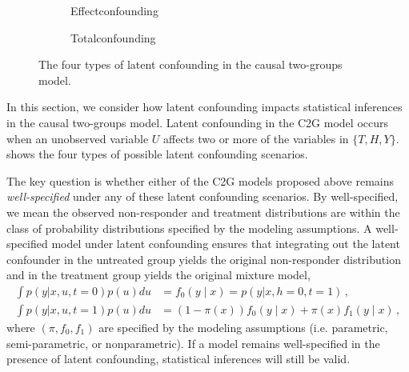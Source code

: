 \begin{figure*}[t]
\begin{subfigure}{0.22\linewidth}
{}
\caption{\centering \label{fig:confounding:effect}Effect\newline confounding}
\end{subfigure}\quad
\begin{subfigure}{0.22\linewidth}
\centering
{}
\caption{\centering \label{fig:confounding:total}Total\newline confounding}
\end{subfigure}
\caption{\label{fig:confounding}
The four types of latent confounding in the causal two-groups model.}
\end{figure*}

In this section, we consider how latent confounding impacts statistical inferences in the causal two-groups model. Latent confounding in the C2G model occurs when an unobserved variable $U$ affects two or more of the variables in $\{T, H, Y \}$.   shows the four types of possible latent confounding scenarios.

The key question is whether either of the C2G models proposed above remains \emph{well-specified} under any of these latent confounding scenarios. By well-specified, we mean the observed non-responder and treatment distributions are within the class of probability distributions specified by the modeling assumptions. A well-specified model under latent confounding ensures that integrating out the latent confounder in the untreated group yields the original non-responder distribution and in the treatment group yields the original mixture model,
\begin{equation}
\begin{aligned}
\int p(y | x, u, t=0) p(u) du & = f_0(y \mid x) = p(y | x, h=0, t=1) \, , \\
\int p(y | x, u, t=1) p(u) du &= (1-\pi(x)) f_0(y \mid x) + \pi(x) f_1(y \mid x) \, ,
\end{aligned}
\label{eqn:well-specified}
\end{equation}
where $(\pi, f_0, f_1)$ are specified by the modeling assumptions (i.e. parametric, semi-parametric, or nonparametric). If a model remains well-specified in the presence of latent confounding, statistical inferences will still be valid.

